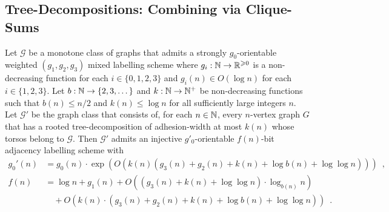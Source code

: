 \documentclass{patmorin}
\renewcommand{\ge}{\geqslant}
\renewcommand{\le}{\leqslant}
\newcommand{\Oh}{O}
\newcommand{\calG}{\mathcal{G}}
\begin{document}
\subsection{Tree-Decompositions: Combining via Clique-Sums}
\begin{lem}\label{lem:the_big_one}
  Let $\calG$ be a monotone class of graphs that admits a strongly $g_0$-orientable weighted $(g_1,g_2,g_3)$ mixed labelling scheme where $g_i:\N\to\R^{\ge 0}$ is a non-decreasing function for each $i\in\{0,1,2,3\}$ and $g_i(n)\in\Oh(\log n)$ for each $i\in\{1,2,3\}$. Let $b:\mathbb{N}\to\{2,3,\dots\}$ and $k:\mathbb{N}\to\mathbb{N}^+$ be non-decreasing functions such that $b(n)\le n/2$ and $k(n)\le \log n$ for all sufficiently large integers $n$.  Let $\calG'$ be the graph class that consists of, for each $n\in\mathbb{N}$, every $n$-vertex graph $G$ that has a rooted tree-decomposition of adhesion-width at most $k(n)$ whose torsos belong to $\calG$. 
  Then $\calG'$ admits an injective $g'_0$-orientable $f(n)$-bit adjacency labelling scheme with
  \begin{align*}
    g_0'(n) & = g_0(n)\cdot \exp(\Oh(k(n)(g_3(n)+g_2(n)+k(n)+\log b(n)+\log\log n))) \enspace, \\
    f(n) & = \log n + g_1(n) + \Oh((g_3(n)+k(n)+\log\log n)\cdot \log_{b(n)} n) \\
    & \quad + \Oh(k(n)\cdot (g_3(n)+g_2(n) + k(n) + \log b(n) + \log\log n )) \enspace .
  \end{align*}
\end{lem}
\end{document}
